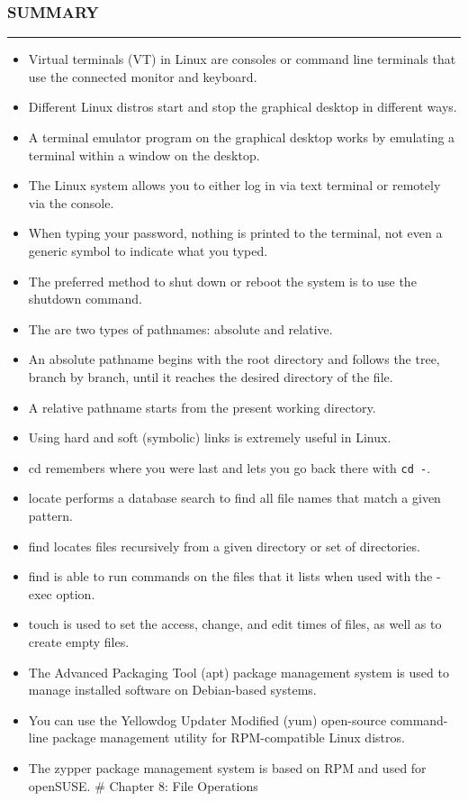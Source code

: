 \subsubsection{SUMMARY}\label{summary-5}

\begin{center}\rule{3in}{0.4pt}\end{center}

\begin{itemize}
\itemsep1pt\parskip0pt
\item
  Virtual terminals (VT) in Linux are consoles or command line terminals
  that use the connected monitor and keyboard.
\item
  Different Linux distros start and stop the graphical desktop in
  different ways.
\item
  A terminal emulator program on the graphical desktop works by
  emulating a terminal within a window on the desktop.
\item
  The Linux system allows you to either log in via text terminal or
  remotely via the console.
\item
  When typing your password, nothing is printed to the terminal, not
  even a generic symbol to indicate what you typed.
\item
  The preferred method to shut down or reboot the system is to use the
  shutdown command.
\item
  The are two types of pathnames: absolute and relative.
\item
  An absolute pathname begins with the root directory and follows the
  tree, branch by branch, until it reaches the desired directory of the
  file.
\item
  A relative pathname starts from the present working directory.
\item
  Using hard and soft (symbolic) links is extremely useful in Linux.
\item
  cd remembers where you were last and lets you go back there with
  \texttt{cd -}.
\item
  locate performs a database search to find all file names that match a
  given pattern.
\item
  find locates files recursively from a given directory or set of
  directories.
\item
  find is able to run commands on the files that it lists when used with
  the -exec option.
\item
  touch is used to set the access, change, and edit times of files, as
  well as to create empty files.
\item
  The Advanced Packaging Tool (apt) package management system is used to
  manage installed software on Debian-based systems.
\item
  You can use the Yellowdog Updater Modified (yum) open-source
  command-line package management utility for RPM-compatible Linux
  distros.
\item
  The zypper package management system is based on RPM and used for
  openSUSE. \# Chapter 8: File Operations
\end{itemize}

